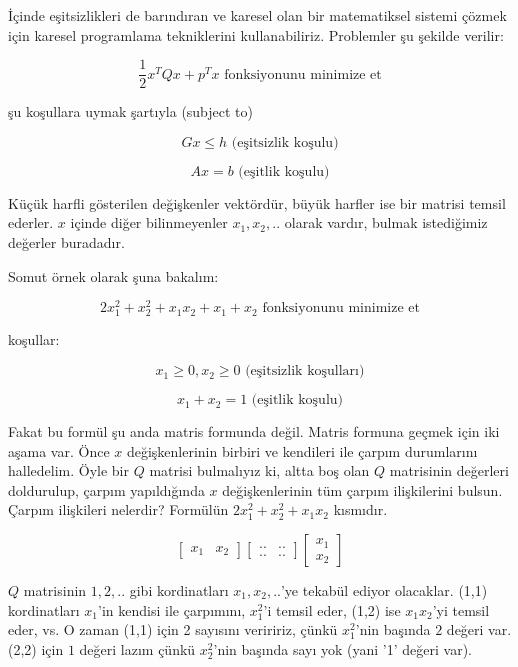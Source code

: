 \documentclass[12pt,fleqn]{article}\usepackage{../../common}
\begin{document}
İçinde eşitsizlikleri de barındıran ve karesel olan bir matematiksel sistemi
çözmek için karesel programlama tekniklerini kullanabiliriz. Problemler şu
şekilde verilir:

$$ \frac{1}{2}x^TQx+p^Tx \textrm{ fonksiyonunu minimize et} $$

şu koşullara uymak şartıyla (subject to)

$$ Gx \leq h \textrm{ (eşitsizlik koşulu)} $$

$$ Ax = b \textrm{ (eşitlik koşulu)} $$

Küçük harfli gösterilen değişkenler vektördür, büyük harfler ise bir matrisi
temsil ederler. $x$ içinde diğer bilinmeyenler $x_1, x_2, ..$ olarak
vardır, bulmak istediğimiz değerler buradadır.

Somut örnek olarak şuna bakalım:

$$ 2x_1^2 + x_2^2 + x_1x_2+x_1+x_2 \textrm{ fonksiyonunu minimize et} $$

koşullar:

$$ x_1 \geq 0, x_2 \geq 0 \textrm{ (eşitsizlik koşulları)} $$

$$ x_1 + x_2 = 1 \textrm{ (eşitlik koşulu)} $$

Fakat bu formül şu anda matris formunda değil. Matris formuna geçmek için iki
aşama var. Önce $x$ değişkenlerinin birbiri ve kendileri ile çarpım durumlarını
halledelim. Öyle bir $Q$ matrisi bulmalıyız ki, altta boş olan $Q$ matrisinin
değerleri doldurulup, çarpım yapıldığında $x$ değişkenlerinin tüm çarpım
ilişkilerini bulsun. Çarpım ilişkileri nelerdir?  Formülün $2x_1^2 + x_2^2 +
x_1x_2$ kısmıdır.

$$ 
\left[ \begin{array}{cc}
x_1 & x_2 
\end{array} \right]
\left[ \begin{array}{cc}
.. & .. \\ .. & ..
\end{array} \right]
\left[ \begin{array}{c}
x_1 \\  x_2 
\end{array} \right]
$$

$Q$ matrisinin $1,2,..$ gibi kordinatları $x_1,x_2,..$'ye tekabül ediyor
olacaklar.  (1,1) kordinatları $x_1$'in kendisi ile çarpımını, $x_1^2$'i temsil
eder, (1,2) ise $x_1x_2$'yi temsil eder, vs. O zaman (1,1) için 2 sayısını
veriririz, çünkü $x_1^2$'nin başında $2$ değeri var. (2,2) için $1$ değeri lazım
çünkü $x_2^2$'nin başında sayı yok (yani '1' değeri var).
\end{document}
